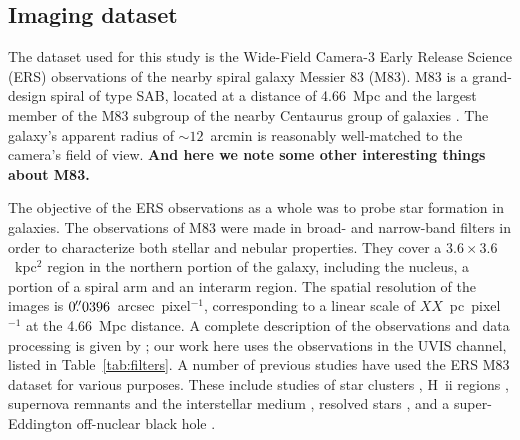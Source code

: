 
\subsection{Imaging dataset}
The dataset used for this study is the Wide-Field Camera-3
Early Release Science (ERS) observations of the nearby spiral galaxy Messier 83 (M83).
M83 is a grand-design spiral of type SAB, located at a distance of 4.66~Mpc \citep{tully13}
and the largest member of the M83 subgroup of the nearby Centaurus group of galaxies \citep{tully15}.
The galaxy's apparent radius of $\sim12$~arcmin \citep{} is reasonably well-matched to the camera's field of view.
{\bf And here we note some other interesting things about M83.}

The objective of the ERS observations as a whole was to probe star formation in galaxies.
The observations of M83 were made in broad- and narrow-band filters in order to characterize both stellar and nebular properties.
They cover a $3.6\times3.6$~kpc$^2$ region in the northern portion of the galaxy, including the nucleus,
a portion of a spiral arm and an interarm region.
The spatial resolution of the images is $0\hbox{$.\!\!^{\prime\prime}$}0396$~arcsec~pixel$^{-1}$,
corresponding to a linear scale of $XX$~pc~pixel$^{-1}$ at the 4.66~Mpc distance.
A complete description of the observations and data processing is given by \citet{chandar10};
our work here uses the observations in the UVIS channel, listed in Table~\ref{tab:filters}.
A number of previous studies have used the ERS M83 dataset for various purposes.
These include studies of 
star clusters \citep{chandar10, wofford11, whitmore11, bastian11, bastian12, fouesneau12, silva13, andrews14, chandar14, adamo15,ryon15,hollyhead15, sun16},
H~{\sc ii} regions \citep{liu13}, supernova remnants and the interstellar medium \citep{dopita10, hong11, blair14, blair15}, 
resolved stars \citep{kim12, williams15},
and a super-Eddington off-nuclear black hole \citep{soria14}.



